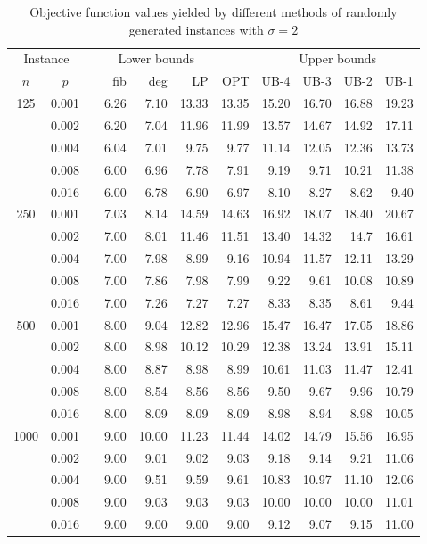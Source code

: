 \begin{table}[]
\centering
\begin{tabular}{cccrrrrrrrr}
	\multicolumn{2}{c}{Instance} & &\multicolumn{3}{c}{Lower bounds}  & &\multicolumn{4}{c}{Upper bounds} \\
\cline{1-2}\cline{4-6}\cline{8-11}
	$n$ & $p$ &  & fib  & deg  & LP  &  OPT & UB-4  & UB-3  & UB-2  & UB-1  \\
\hline
\multirow{5}{*}{125} 
& 0.001 && 6.26 & 7.10 & 13.33 & 13.35 & 15.20 & 16.70 & 16.88 & 19.23 \\
& 0.002 && 6.20 & 7.04 & 11.96 & 11.99 & 13.57 & 14.67 & 14.92 & 17.11 \\
& 0.004 && 6.04 & 7.01 & 9.75  & 9.77  & 11.14 & 12.05 & 12.36 & 13.73 \\
& 0.008 && 6.00 & 6.96 & 7.78  & 7.91  & 9.19  & 9.71  & 10.21 & 11.38 \\
& 0.016 && 6.00 & 6.78 & 6.90  & 6.97  & 8.10  & 8.27  & 8.62  & 9.40  \\
\hline
\multirow{5}{*}{250} 
& 0.001 && 7.03 & 8.14 & 14.59 & 14.63 & 16.92 & 18.07 & 18.40 & 20.67 \\
& 0.002 && 7.00 & 8.01 & 11.46 & 11.51 & 13.40 & 14.32 & 14.7  & 16.61 \\
& 0.004 && 7.00 & 7.98 & 8.99  & 9.16  & 10.94 & 11.57 & 12.11 & 13.29 \\
& 0.008 && 7.00 & 7.86 & 7.98  & 7.99  & 9.22  & 9.61  & 10.08 & 10.89 \\
& 0.016 && 7.00 & 7.26 & 7.27  & 7.27  & 8.33  & 8.35  & 8.61  & 9.44  \\
\hline
\multirow{5}{*}{500} 
& 0.001 && 8.00 & 9.04 & 12.82 &12.96  &15.47  & 16.47 & 17.05 & 18.86 \\
& 0.002 && 8.00 & 8.98 & 10.12 &10.29  &12.38  & 13.24 & 13.91 & 15.11 \\
& 0.004 && 8.00 & 8.87 & 8.98  &8.99   &10.61  & 11.03 & 11.47 & 12.41 \\
& 0.008 && 8.00 & 8.54 & 8.56  &8.56   &9.50   & 9.67  & 9.96  & 10.79 \\
& 0.016 && 8.00 & 8.09 & 8.09  &8.09   &8.98   & 8.94  & 8.98  & 10.05 \\
\hline
\multirow{5}{*}{1000} 
& 0.001 && 9.00 & 10.00 & 11.23 & 11.44 & 14.02 & 14.79 & 15.56 & 16.95 \\
& 0.002 && 9.00 & 9.01  & 9.02  & 9.03  & 9.18  & 9.14  & 9.21  & 11.06 \\
& 0.004 && 9.00 & 9.51  & 9.59  & 9.61  & 10.83 & 10.97 & 11.10 & 12.06 \\
& 0.008 && 9.00 & 9.03  & 9.03  & 9.03  & 10.00 & 10.00 & 10.00 & 11.01 \\
& 0.016 && 9.00 & 9.00  & 9.00  & 9.00  & 9.12  & 9.07  & 9.15  & 11.00 \\
\end{tabular}
\caption{Objective function values yielded by different methods of randomly generated instances with $\sigma=2$}
\label{tab:obj-s2}
\end{table}


